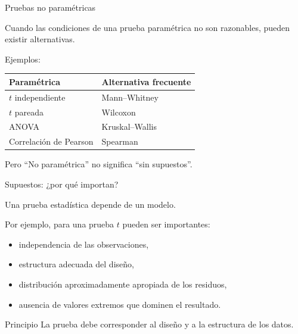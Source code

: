 \begin{frame}{Pruebas no paramétricas}

Cuando las condiciones de una prueba paramétrica no son razonables,
pueden existir alternativas.

Ejemplos:

\begin{center}
\begin{tabular}{ll}
\toprule
Paramétrica & Alternativa frecuente\\
\midrule
$t$ independiente & Mann--Whitney\\
$t$ pareada & Wilcoxon\\
ANOVA & Kruskal--Wallis\\
Correlación de Pearson & Spearman\\
\bottomrule
\end{tabular}
\end{center}

\begin{alertblock}{Pero}
``No paramétrica'' no significa ``sin supuestos''.
\end{alertblock}

\end{frame}

\begin{frame}{Supuestos: ¿por qué importan?}

Una prueba estadística depende de un modelo.

Por ejemplo, para una prueba $t$ pueden ser importantes:

\begin{itemize}
    \item independencia de las observaciones,
    \item estructura adecuada del diseño,
    \item distribución aproximadamente apropiada de los residuos,
    \item ausencia de valores extremos que dominen el resultado.
\end{itemize}

\begin{block}{Principio}
La prueba debe corresponder al diseño y a la estructura de los datos.
\end{block}

\end{frame}

